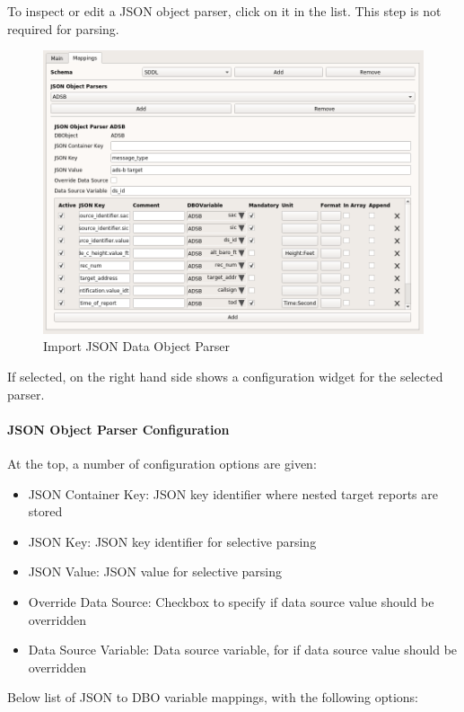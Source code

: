 {To inspect or edit a JSON object parser, click on it in the list. This step is not required for parsing.

\begin{figure}[H]
  \hspace*{-1cm}
    \includegraphics[width=16cm,frame]{../screenshots/import_json_data_object_parser.png}
  \caption{Import JSON Data Object Parser}
\end{figure}

If selected, on the right hand side shows a configuration widget for the selected parser.

\paragraph{JSON Object Parser Configuration}
At the top, a number of configuration options are given:

\begin{itemize}  
\item JSON Container Key: JSON key identifier where nested target reports are stored
\item JSON Key: JSON key identifier for selective parsing
\item JSON Value: JSON value for selective parsing
\item Override Data Source: Checkbox to specify if data source value should be overridden
\item Data Source Variable: Data source variable, for if data source value should be overridden
\end{itemize}


Below list of JSON to DBO variable mappings, with the following options:

}
